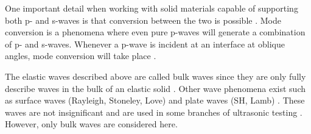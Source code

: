 \documentclass[11pt,twoside]{eitExjobb}
\begin{document}
	One important detail when working with solid materials capable of supporting both p- and s-waves is that conversion between the two is possible \cite{Schmerr2016}. Mode conversion is a phenomena where even pure p-waves will generate a combination of p- and s-waves. Whenever a p-wave is incident at an interface at oblique angles, mode conversion will take place \cite{Schmerr2016}.
	
	The elastic waves described above are called bulk waves since they are only fully describe waves in the bulk of an elastic solid \cite{Kaufman2005}. Other wave phenomena exist such as surface waves (Rayleigh, Stoneley, Love) \cite{Kaufman2005} and plate waves (SH, Lamb) \cite{Schmerr2016}. These waves are not insignificant and are used in some branches of ultrasonic testing \cite{Schmerr2016}. However, only bulk waves are considered here.
	
\end{document}
